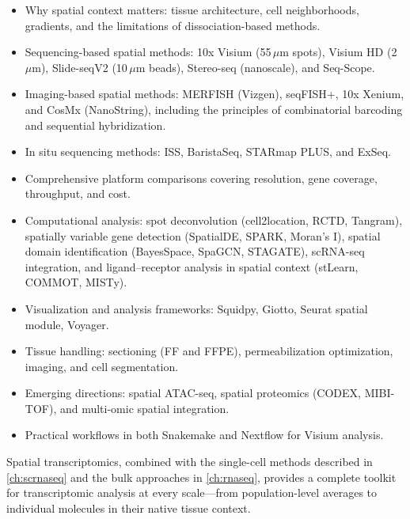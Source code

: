 \begin{itemize}[nosep]
  \item Why spatial context matters: tissue architecture, cell neighborhoods,
    gradients, and the limitations of dissociation-based methods.
  \item Sequencing-based spatial methods: 10x Visium (55\,$\mu$m spots), Visium HD
    (2\,$\mu$m), Slide-seqV2 (10\,$\mu$m beads), Stereo-seq (nanoscale), and
    Seq-Scope.
  \item Imaging-based spatial methods: MERFISH (Vizgen), seqFISH+, 10x Xenium,
    and CosMx (NanoString), including the principles of combinatorial barcoding
    and sequential hybridization.
  \item In situ sequencing methods: ISS, BaristaSeq, STARmap PLUS, and ExSeq.
  \item Comprehensive platform comparisons covering resolution, gene coverage,
    throughput, and cost.
  \item Computational analysis: spot deconvolution (cell2location, RCTD,
    Tangram), spatially variable gene detection (SpatialDE, SPARK, Moran's I),
    spatial domain identification (BayesSpace, SpaGCN, STAGATE), scRNA-seq
    integration, and ligand--receptor analysis in spatial context (stLearn,
    COMMOT, MISTy).
  \item Visualization and analysis frameworks: Squidpy, Giotto, Seurat spatial
    module, Voyager.
  \item Tissue handling: sectioning (FF and FFPE), permeabilization
    optimization, imaging, and cell segmentation.
  \item Emerging directions: spatial ATAC-seq, spatial proteomics (CODEX,
    MIBI-TOF), and multi-omic spatial integration.
  \item Practical workflows in both Snakemake and Nextflow for Visium analysis.
\end{itemize}

Spatial transcriptomics, combined with the single-cell methods described in
\cref{ch:scrnaseq} and the bulk approaches in \cref{ch:rnaseq}, provides a
complete toolkit for transcriptomic analysis at every scale---from
population-level averages to individual molecules in their native tissue
context.
